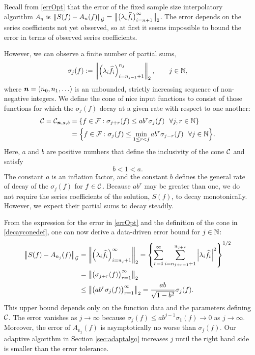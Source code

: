\documentclass[graybox,footinfo]{svmult}
\newcommand{\DHJRnorm}[2][{}]{\ensuremath{\left \lVert #2 \right \rVert}_{#1}}
\newcommand{\DHJRbignorm}[2][{}]{\ensuremath{\bigl \lVert #2 \bigr \rVert}_{#1}}
\newcommand{\DHJRabs}[1]{\ensuremath{{\left \lvert #1 \right \rvert}}}
\begin{document}
Recall from \eqref{errOpt} that the error of the fixed sample size interpolatory algorithm $A_n$ is $\DHJRnorm[\calG]{S(f) - A_n(f)} = \DHJRbignorm[2]{\bigl(\lambda_{i} \widehat{f}_{i} \bigr)_{i= n+1}^{\infty}}$.  The error depends on the series coefficients not yet observed, so at first it seems impossible to bound the error in terms of observed series coefficients.  

However, we can observe a finite number of partial sums, 
\begin{equation} \label{sumdef}
\sigma_j(f) :
= \DHJRnorm[2]{ \left(\lambda_{i} \widehat{f}_{i} \right)_{i=n_{j-1}+1}^{n_j}}, \qquad j \in \bbN,
\end{equation}
where ${\boldsymbol{n}}  = (n_0, n_1, \ldots)$ is an unbounded, strictly increasing sequence of non-negative integers.  We define the cone of nice input functions to consist of those functions for which the $\sigma_j(f)$ decay at a given rate with respect to one another:
\begin{align} \label{decayconedef}
\calC = \calC_{\bsn,a,b} &= \left\{ f \in \calF : \sigma_{j+r}(f) \le ab^r \sigma_j (f) \ \ \forall j,r \in \bbN \right\} \\
\nonumber
& = \Bigl\{ f \in \calF : \sigma_j(f) \le \min_{1 \le r < j}ab^r\sigma_{j-r}(f) \ \ \forall j \in \bbN \Bigr\}.
\end{align}
Here, $a$ and $b$ are positive numbers that define the inclusivity of the cone ${\mathcal{C}}$ and satisfy
\begin{equation*} \label{abcond}
b <1 < a.
\end{equation*}
The constant $a$ is an inflation factor, and the constant $b$ defines the general rate of decay of the $\sigma_j(f)$ for $f \in {\mathcal{C}}$. Because $ab^r$ may be greater than one, we do not require the series coefficients of the solution, $S(f)$, to decay monotonically. However, we expect their partial sums to decay steadily.

From the expression for the error in \eqref{errOpt} and the definition of the cone in  \eqref{decayconedef}, one can now derive a data-driven error bound for $j \in {\mathbb{N}}$:
\begin{align}
\nonumber
\DHJRnorm[\calG]{S(f)-A_{n_j}(f)} &= \DHJRnorm[2]{\left(\lambda_{i} \widehat{f}_{i} \right)_{i = n_j+1}^\infty} = \left\{\sum_{r=1}^\infty \sum_{i=n_{j+r-1}+1}^{n_{j+r}}  \DHJRabs{\lambda_{i}\widehat{f}_{i} }^{2}  \right\}^{1/2}\\
\nonumber
&= \DHJRnorm[2]{ \bigl(\sigma_{j+r}(f)\bigr)_{r=1}^{\infty}} \\
&\le \DHJRnorm[2]{ \bigl(ab^r\sigma_{j}(f)\bigr)_{r=1}^{\infty}}
 = \displaystyle  \frac{ab}{\sqrt{1 - b^2}}\sigma_{j}(f).
 \label{algoineq}
\end{align}
This upper bound depends only on the function data and the parameters defining ${\mathcal{C}}$.  The error vanishes as $j \to \infty$ because $\sigma_j(f) \le ab^{j-1} \sigma_1(f) \to 0$ as $j \to \infty$.  Moreover, the error of $A_{n_j}(f)$ is asymptotically no worse than $\sigma_j(f)$. Our adaptive algorithm in Section \ref{sec:adaptalgo} increases $j$ until the right hand side is smaller than the error tolerance.
\end{document}
